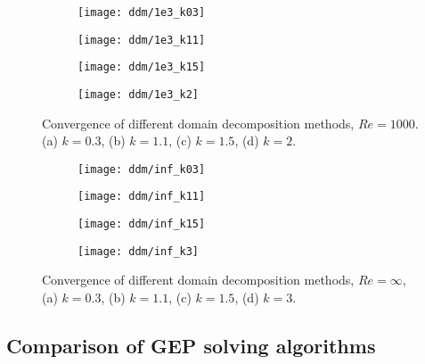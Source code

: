 \begin{figure}[ht]
     \centering
     \begin{subfigure}[b]{0.48\columnwidth}
         \centering
         \texttt{[image: ddm/1e3\_k03]}
         \caption{}
     \end{subfigure}
     \hspace{0.05\columnwidth}
     \begin{subfigure}[b]{0.48\columnwidth}
         \centering
         \texttt{[image: ddm/1e3\_k11]}
         \caption{}
     \end{subfigure}
     \hspace{0.05\columnwidth}
     \begin{subfigure}[b]{0.48\columnwidth}
         \centering
         \texttt{[image: ddm/1e3\_k15]}
         \caption{}
     \end{subfigure}
     \hspace{0.05\columnwidth}
     \begin{subfigure}[b]{0.48\columnwidth}
         \centering
         \texttt{[image: ddm/1e3\_k2]}
         \caption{}
     \end{subfigure}
        \caption{Convergence of different domain decomposition methods, $Re=1000$. (a) $k=0.3$, (b) $k=1.1$, (c) $k=1.5$, (d) $k=2$.}
        \label{fig:ddm_1e3}
\end{figure}

\begin{figure}[ht]
     \centering
     \begin{subfigure}[b]{0.48\columnwidth}
         \centering
         \texttt{[image: ddm/inf\_k03]}
         \caption{}
     \end{subfigure}
     \hspace{0.05\columnwidth}
     \begin{subfigure}[b]{0.48\columnwidth}
         \centering
         \texttt{[image: ddm/inf\_k11]}
         \caption{}
     \end{subfigure}
     \hspace{0.05\columnwidth}
     \begin{subfigure}[b]{0.48\columnwidth}
         \centering
         \texttt{[image: ddm/inf\_k15]}
         \caption{}
     \end{subfigure}
     \hspace{0.05\columnwidth}
     \begin{subfigure}[b]{0.48\columnwidth}
         \centering
         \texttt{[image: ddm/inf\_k3]}
         \caption{}
     \end{subfigure}
        \caption{Convergence of different domain decomposition methods, $Re=\infty$, (a) $k=0.3$, (b) $k=1.1$, (c) $k=1.5$, (d) $k=3$.}
        \label{fig:ddm_inf}
\end{figure}


\subsection{Comparison of GEP solving algorithms}
